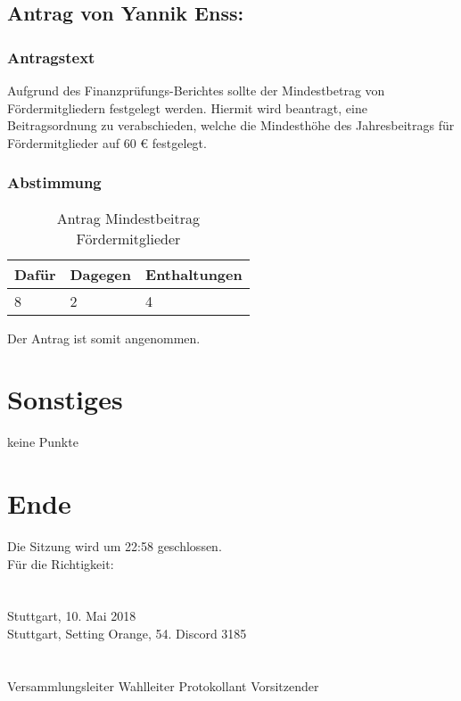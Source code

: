 \documentclass[a4paper]{scrartcl}
\begin{document}
\subsection{Antrag von Yannik Enss: }
\subsubsection{Antragstext}
Aufgrund des Finanzprüfungs-Berichtes sollte der Mindestbetrag von Fördermitgliedern festgelegt werden. Hiermit wird beantragt, eine Beitragsordnung zu verabschieden, welche die Mindesthöhe des Jahresbeitrags für Fördermitglieder auf 60 € festgelegt.
\subsubsection{Abstimmung}
\begin{table}[H]
	\begin{tabularx}{\textwidth}{XXX}
		Dafür & Dagegen & Enthaltungen\\
		\toprule
		8 & 2 & 4\\
	\end{tabularx}
	\caption{Antrag Mindestbeitrag Fördermitglieder}
\end{table}
Der Antrag ist somit angenommen.

\section{Sonstiges}

keine Punkte

\section{Ende}
Die Sitzung wird um 22:58 geschlossen.
\vfill
\mbox{}\\
Für die Richtigkeit:\\
\\
\\
Stuttgart, 10. Mai 2018\\
Stuttgart, Setting Orange, 54. Discord 3185 \\
\\
\\
\hfill Versammlungsleiter \hfill Wahlleiter \hfill Protokollant \hfill Vorsitzender \hfill
\end{document}
